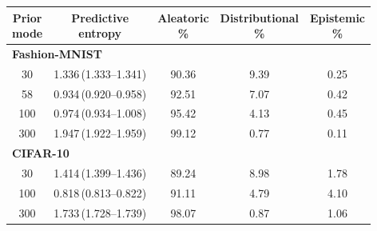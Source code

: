 \begin{tabular}{ccccc}
\toprule
\shortstack{Prior\\mode} & \shortstack{Predictive\\entropy} & \shortstack{Aleatoric\\\%} & \shortstack{Distributional\\\%} & \shortstack{Epistemic\\\%} \\
\midrule
\multicolumn{5}{l}{\textbf{Fashion-MNIST}} \\
30 & 1.336\,(1.333--1.341) & 90.36 & 9.39 & 0.25 \\
58 & 0.934\,(0.920--0.958) & 92.51 & 7.07 & 0.42 \\
100 & 0.974\,(0.934--1.008) & 95.42 & 4.13 & 0.45 \\
300 & 1.947\,(1.922--1.959) & 99.12 & 0.77 & 0.11 \\
\midrule
\multicolumn{5}{l}{\textbf{CIFAR-10}} \\
30 & 1.414\,(1.399--1.436) & 89.24 & 8.98 & 1.78 \\
100 & 0.818\,(0.813--0.822) & 91.11 & 4.79 & 4.10 \\
300 & 1.733\,(1.728--1.739) & 98.07 & 0.87 & 1.06 \\
\bottomrule
\end{tabular}

